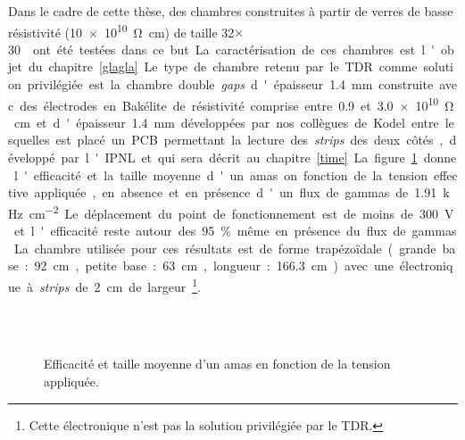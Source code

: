 Dans le cadre de cette thèse, des chambres construites à partir de verres de basse résistivité (\SI{10e10}{\ohm\centi\meter}) de taille \num{32}$\times$\SI{30}{\centi\meter\square} ont été testées dans ce but. La caractérisation de ces chambres est l'objet du chapitre \ref{glagla}.


Le type de chambre retenu par le TDR comme solution privilégiée est la chambre double \textit{gaps} d'épaisseur \SI{1.4}{\milli\meter} construite avec des électrodes en Bakélite de résistivité comprise entre \num{0.9} et \SI{3.0e10}{\ohm\centi\meter} et d'épaisseur \SI{1.4}{\milli\meter} développées par nos collègues de Kodel entre lesquelles est placé un PCB permettant la lecture des \textit{strips} des deux côtés, développé par l'IPNL et qui sera décrit au chapitre \ref{time}. 

La figure \ref{datairpc} donne l'efficacité et la taille moyenne d'un amas on fonction de la tension effective appliquée, en absence et en présence d'un flux de gammas de \SI{1.91}{\kilo\hertz\per\square\centi\meter}. Le déplacement du point de fonctionnement est de moins de \SI{300}{\volt} et l'efficacité reste autour des \num{95}\% même en présence du flux de gammas. La chambre utilisée pour ces résultats est de forme trapézoïdale (grande base : \SI{92}{\centi\meter}, petite base : \SI{63}{\centi\meter}, longueur : \SI{166.3}{\centi\meter}) avec une électronique à \textit{strips} de \SI{2}{\centi\meter} de largeur\footnote{Cette électronique n'est pas la solution privilégiée par le TDR.}.

\begin{figure}[ht!]
	\centering
	\\
	\\
	\caption{Efficacité et taille moyenne d'un amas en fonction de la tension appliquée.}
	\label{datairpc}
\end{figure}

